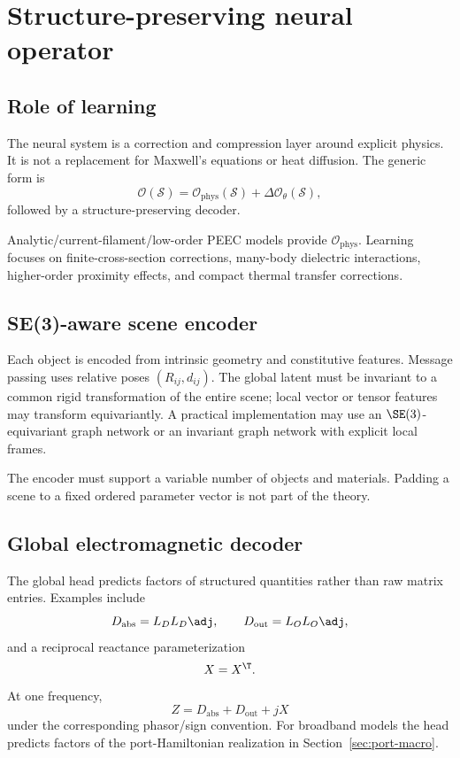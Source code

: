 \section{Structure-preserving neural operator}

\subsection{Role of learning}

The neural system is a correction and compression layer around explicit
physics. It is not a replacement for Maxwell's equations or heat diffusion.
The generic form is
\[
  \mathcal O(\mathcal S)
  =
  \mathcal O_{\mathrm{phys}}(\mathcal S)
  +\Delta\mathcal O_\theta(\mathcal S),
\]
followed by a structure-preserving decoder.

Analytic/current-filament/low-order PEEC models provide
$\mathcal O_{\mathrm{phys}}$. Learning focuses on finite-cross-section
corrections, many-body dielectric interactions, higher-order proximity effects,
and compact thermal transfer corrections.

\subsection{SE(3)-aware scene encoder}

Each object is encoded from intrinsic geometry and constitutive features.
Message passing uses relative poses $(R_{ij},d_{ij})$. The global latent must be
invariant to a common rigid transformation of the entire scene; local vector or
tensor features may transform equivariantly. A practical implementation may use
an $\SE(3)$-equivariant graph network or an invariant graph network with
explicit local frames.

The encoder must support a variable number of objects and materials. Padding a
scene to a fixed ordered parameter vector is not part of the theory.

\subsection{Global electromagnetic decoder}

The global head predicts factors of structured quantities rather than raw
matrix entries. Examples include
\[
 D_{\mathrm{abs}}=L_D L_D\adj,\qquad
 D_{\mathrm{out}}=L_O L_O\adj,
\]
and a reciprocal reactance parameterization
\[
 X=X^\T.
\]
At one frequency,
\[
 Z=D_{\mathrm{abs}}+D_{\mathrm{out}}+jX
\]
under the corresponding phasor/sign convention. For broadband models the head
predicts factors of the port-Hamiltonian realization in
Section~\ref{sec:port-macro}.


